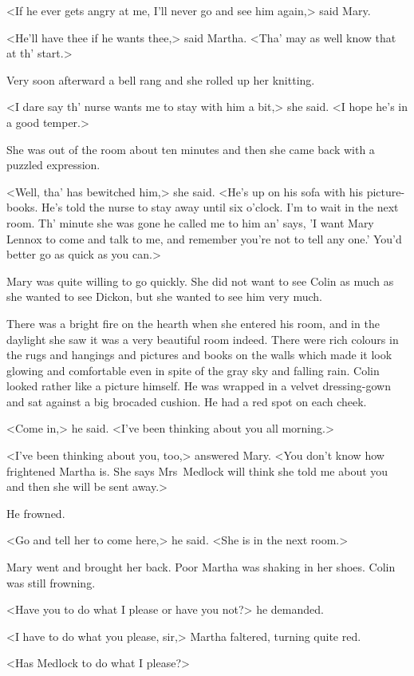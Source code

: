 <If he ever gets angry at me, I'll never go and see him again,> said Mary.

<He'll have thee if he wants thee,> said Martha. <Tha' may as well know that at th' start.>

Very soon afterward a bell rang and she rolled up her knitting.

<I dare say th' nurse wants me to stay with him a bit,> she said. <I hope he's in a good temper.>

She was out of the room about ten minutes and then she came back with a puzzled expression.

<Well, tha' has bewitched him,> she said. <He's up on his sofa with his picture-books. He's told the nurse to stay away until six o'clock. I'm to wait in the next room. Th' minute she was gone he called me to him an' says, 'I want Mary Lennox to come and talk to me, and remember you're not to tell any one.' You'd better go as quick as you can.>

Mary was quite willing to go quickly. She did not want to see Colin as much as she wanted to see Dickon, but she wanted to see him very much.

There was a bright fire on the hearth when she entered his room, and in the daylight she saw it was a very beautiful room indeed. There were rich colours in the rugs and hangings and pictures and books on the walls which made it look glowing and comfortable even in spite of the gray sky and falling rain. Colin looked rather like a picture himself. He was wrapped in a velvet dressing-gown and sat against a big brocaded cushion. He had a red spot on each cheek.

<Come in,> he said. <I've been thinking about you all morning.>

<I've been thinking about you, too,> answered Mary. <You don't know how frightened Martha is. She says Mrs~Medlock will think she told me about you and then she will be sent away.>

He frowned.

<Go and tell her to come here,> he said. <She is in the next room.>

Mary went and brought her back. Poor Martha was shaking in her shoes. Colin was still frowning.

<Have you to do what I please or have you not?> he demanded.

<I have to do what you please, sir,> Martha faltered, turning quite red.

<Has Medlock to do what I please?>


